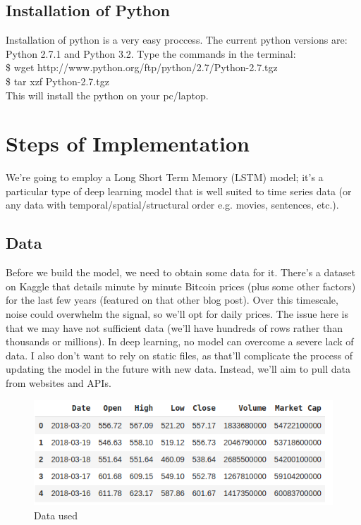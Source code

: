 \subsection{Installation of Python}
Installation of python is a very easy proccess.
The current python versions are: Python 2.7.1 and Python 3.2.
Type the commands in the terminal:\\

 \$ wget http://www.python.org/ftp/python/2.7/Python-2.7.tgz\\

 
 \$ tar xzf Python-2.7.tgz\\


This will install the python on your pc/laptop.




\section{Steps of Implementation}
We’re going to employ a Long Short Term Memory (LSTM) model; it’s a particular type of deep learning model that is well suited to time series data (or any data with temporal/spatial/structural order e.g. movies, sentences, etc.).
    \subsection{Data}
    Before we build the model, we need to obtain some data for it. There’s a dataset on Kaggle that details minute by minute Bitcoin prices (plus some other factors) for the last few years (featured on that other blog post). Over this timescale, noise could overwhelm the signal, so we’ll opt for daily prices. The issue here is that we may have not sufficient data (we’ll have hundreds of rows rather than thousands or millions). In deep learning, no model can overcome a severe lack of data. I also don’t want to rely on static files, as that’ll complicate the process of updating the model in the future with new data. Instead, we’ll aim to pull data from websites and APIs.

    \begin{figure}[ht]
        \centering \includegraphics[scale=0.7]{images/data.png}
        \caption{Data used}
    \end{figure}

